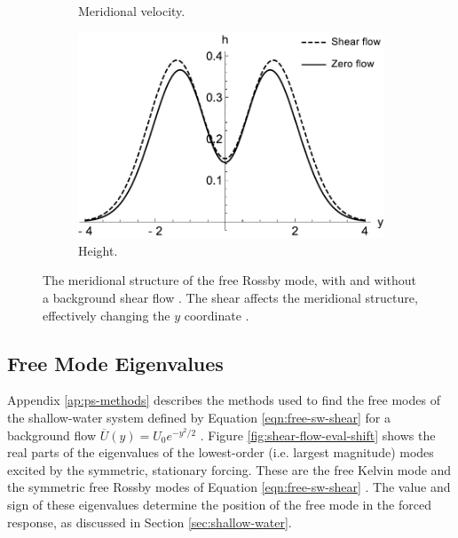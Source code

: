 \begin{figure}
\begin{subfigure}[b]{0.32\textwidth}
    \caption{Meridional velocity.}
    \label{fig:free-v-shear}
  \end{subfigure}
  \begin{subfigure}[b]{0.32\textwidth}
    \includegraphics[width=\textwidth]{figures/wave-mean-flow/free-h-shear.pdf}
    \caption{Height.}
    \label{fig:free-h-shear}
  \end{subfigure}
  \caption{The meridional structure of the free Rossby mode, with and without a background shear flow \citep{hammond2018wavemean}. The shear affects the meridional structure, effectively changing the $y$ coordinate \citep{boyd1978sheari}.}
  \label{fig:free-shear-meridional}
\end{figure}






\subsection{Free Mode Eigenvalues}

Appendix \ref{ap:ps-methods} describes the methods used to find the free modes of the shallow-water system defined by Equation \ref{eqn:free-sw-shear} for a background flow $\overline{U}(y)=U_{0}e^{-y^{2}/2}$ \citep{hammond2018wavemean}. Figure \ref{fig:shear-flow-eval-shift} shows the real parts of the eigenvalues of the lowest-order (i.e. largest magnitude) modes excited by the symmetric, stationary forcing. These are the free Kelvin mode and the symmetric free Rossby modes of Equation \ref{eqn:free-sw-shear} \citep{matsuno1966quasi}. The value and sign of these eigenvalues determine the position of the free mode in the forced response, as discussed in Section \ref{sec:shallow-water}.


